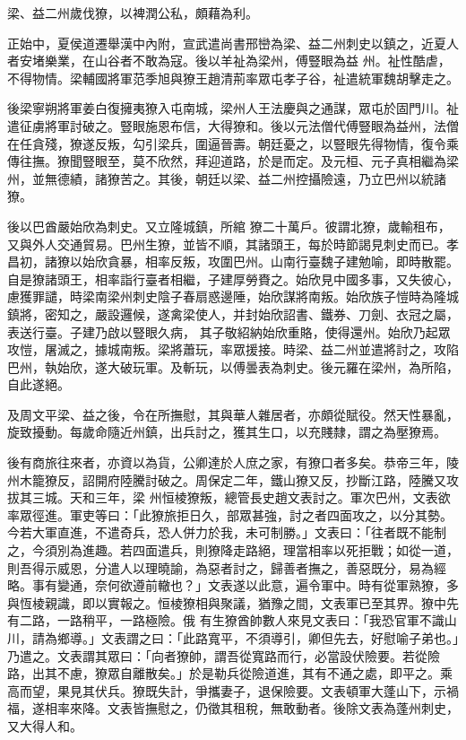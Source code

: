 \begin{pinyinscope}
 梁、益二州歲伐獠，以裨潤公私，頗藉為利。



 正始中，夏侯道遷舉漢中內附，宣武遣尚書邢巒為梁、益二州刺史以鎮之，近夏人者安堵樂業，在山谷者不敢為寇。後以羊祉為梁州，傅豎眼為益
 州。祉性酷虐，不得物情。梁輔國將軍范季旭與獠王趙清荊率眾屯孝子谷，祉遣統軍魏胡擊走之。



 後梁寧朔將軍姜白復擁夷獠入屯南城，梁州人王法慶與之通謀，眾屯於固門川。祉遣征虜將軍討破之。豎眼施恩布信，大得獠和。後以元法僧代傅豎眼為益州，法僧在任貪殘，獠遂反叛，勾引梁兵，圍逼晉壽。朝廷憂之，以豎眼先得物情，復令乘傳往撫。獠聞豎眼至，莫不欣然，拜迎道路，於是而定。及元桓、元子真相繼為梁州，並無德績，諸獠苦之。其後，朝廷以梁、益二州控攝險遠，乃立巴州以統諸獠。



 後以巴酋嚴始欣為刺史。又立隆城鎮，所綰
 獠二十萬戶。彼謂北獠，歲輸租布，又與外人交通貿易。巴州生獠，並皆不順，其諸頭王，每於時節謁見刺史而已。孝昌初，諸獠以始欣貪暴，相率反叛，攻圍巴州。山南行臺魏子建勉喻，即時散罷。自是獠諸頭王，相率詣行臺者相繼，子建厚勞賚之。始欣見中國多事，又失彼心，慮獲罪譴，時梁南梁州刺史陰子春扇惑邊陲，始欣謀將南叛。始欣族子愷時為隆城鎮將，密知之，嚴設邏候，遂禽梁使人，并封始欣詔書、鐵券、刀劍、衣冠之屬，表送行臺。子建乃啟以豎眼久病，
 其子敬紹納始欣重賂，使得還州。始欣乃起眾攻愷，屠滅之，據城南叛。梁將蕭玩，率眾援接。時梁、益二州並遣將討之，攻陷巴州，執始欣，遂大破玩軍。及斬玩，以傅曇表為刺史。後元羅在梁州，為所陷，自此遂絕。



 及周文平梁、益之後，令在所撫慰，其與華人雜居者，亦頗從賦役。然天性暴亂，旋致擾動。每歲命隨近州鎮，出兵討之，獲其生口，以充賤隸，謂之為壓獠焉。



 後有商旅往來者，亦資以為貨，公卿達於人庶之家，有獠口者多矣。恭帝三年，陵州木籠獠反，詔開府陸騰討破之。周保定二年，鐵山獠又反，抄斷江路，陸騰又攻拔其三城。天和三年，梁
 州恒棱獠叛，總管長史趙文表討之。軍次巴州，文表欲率眾徑進。軍吏等曰：「此獠旅拒日久，部眾甚強，討之者四面攻之，以分其勢。今若大軍直進，不遣奇兵，恐人併力於我，未可制勝。」文表曰：「往者既不能制之，今須別為進趣。若四面遣兵，則獠降走路絕，理當相率以死拒戰；如從一道，則吾得示威恩，分遣人以理曉諭，為惡者討之，歸善者撫之，善惡既分，易為經略。事有變通，奈何欲遵前轍也？」文表遂以此意，遍令軍中。時有從軍熟獠，多與恆棱親識，即以實報之。恒棱獠相與聚議，猶豫之間，文表軍已至其界。獠中先有二路，一路稍平，一路極險。俄
 有生獠酋帥數人來見文表曰：「我恐官軍不識山川，請為鄉導。」文表謂之曰：「此路寬平，不須導引，卿但先去，好慰喻子弟也。」乃遣之。文表謂其眾曰：「向者獠帥，謂吾從寬路而行，必當設伏險要。若從險路，出其不慮，獠眾自離散矣。」於是勒兵從險道進，其有不通之處，即平之。乘高而望，果見其伏兵。獠既失計，爭攜妻子，退保險要。文表頓軍大蓬山下，示禍福，遂相率來降。文表皆撫慰之，仍徵其租稅，無敢動者。後除文表為蓬州刺史，又大得人和。




\end{pinyinscope}
